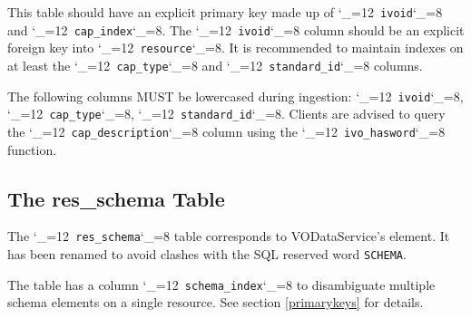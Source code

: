 \documentclass[11pt,a4paper]{ivoa}
\makeatletter
\def\rtent#1{\texttt{\color{rtcolor}\verb|#1|}}
\def\makeunderscoreletter{\catcode`\_=12}
\def\makeunderscoresubscript{\catcode`\_=8}
\def\rtent{\makeunderscoreletter\relax\rt@nt}
\def\rt@nt#1{\texttt{\color{rtcolor} #1}\makeunderscoresubscript{}}
\makeatother
\begin{document}



This table should have an explicit primary key made up of
\rtent{ivoid} and \rtent{cap_index}.
The \rtent{ivoid} column should be
an explicit foreign key into \rtent{resource}.
It is recommended to maintain indexes on at least the
\rtent{cap_type} and \rtent{standard_id} columns.

The following columns MUST be lowercased during ingestion:
\rtent{ivoid}, \rtent{cap_type}, \rtent{standard_id}.
Clients are advised to query the \rtent{cap_description} column
using the \rtent{ivo_hasword} function.



\subsection{The res\_schema Table}

\label{table_res_schema}

The \rtent{res_schema} table corresponds to VODataService's
 element.  It has been renamed to avoid clashes with
the SQL reserved word \texttt{SCHEMA}.

The table has a column \rtent{schema_index} to disambiguate
multiple schema elements on a single resource.  See section \ref{primarykeys} for details.


\end{document}
